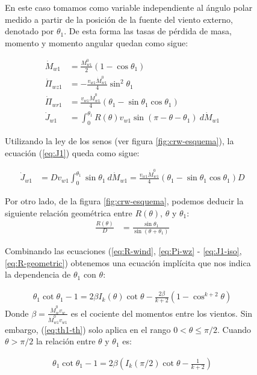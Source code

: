 \begin{figure}
En este caso tomamos como variable independiente al ángulo polar medido a partir de la posición de la fuente del viento externo, denotado por $\theta_1$. De esta forma las tasas de pérdida de masa, momento y momento angular quedan como sigue:

\begin{align}
  \dot{M}_{w1} &= \frac{M^0_{w1}}{2}\left(1 - \cos\theta_1\right)\\
  \dot{\Pi}_{wz1} &= -\frac{v_{w1}\dot{M}^0_{w1}}{4}\sin^2\theta_1\\
  \dot{\Pi}_{wr1} &= \frac{v_{w1}\dot{M}^0_{w1}}{4}\left(\theta_1 - \sin\theta_1\cos\theta_1\right)\\
  \dot{J}_{w1} &= \int^{\theta_1}_0 R(\theta)v_{w1}\sin(\pi-\theta-\theta_1)~d\dot{M}_{w1} \label{eq:J1}
\end{align}

Utilizando la ley de los senos (ver figura \ref{fig:crw-esquema}), la ecuación (\ref{eq:J1}) queda como sigue:

\begin{align}
  \dot{J}_{w1} &= Dv_{w1}\int^{\theta_1}_0 \sin\theta_1~d\dot{M}_{w1} =
                 \frac{v_{w1}\dot{M}^0_{w1}}{4}\left(\theta_1 - \sin\theta_1\cos\theta_1\right) D \label{eq:J1-iso}
\end{align}

Por otro lado, de la figura \ref{fig:crw-esquema}, podemos deducir la siguiente relación geométrica entre $R(\theta)$,
$\theta$ y $\theta_1$:
\begin{align}
  \frac{R(\theta)}{D} &= \frac{\sin\theta_1}{\sin(\theta+\theta_1)} \label{eq:R-geometric}
\end{align}

Combinando las ecuaciones (\ref{eq:R-wind}, \ref{eq:Pi-wz} - \ref{eq:J1-iso}, \ref{eq:R-geometric}) obtenemos una ecuación implícita que nos indica la dependencia de $\theta_1$ con $\theta$:

\begin{align}
  \theta_1\cot\theta_1 -1 = 2\beta I_k(\theta)\cot\theta - \frac{2\beta}{k+2}\left(1 - \cos^{k+2}\theta\right) \label{eq:th1-th} 
\end{align}
Donde $\beta = \frac{\dot{M}^0_w v_w}{\dot{M}^0_{w1}v_{w1}}$ es el cociente del momentos entre los vientos. Sin embargo, (\ref{eq:th1-th}) solo aplica en el rango $0 < \theta \leq \pi/2$. Cuando $\theta > \pi/2$ la relación entre $\theta$ y $\theta_1$ es:

\begin{align}
  \theta_1\cot\theta_1 - 1 = 2\beta\left(I_k(\pi/2)\cot\theta - \frac{1}{k+2}\right)
\end{align}


\end{figure}

